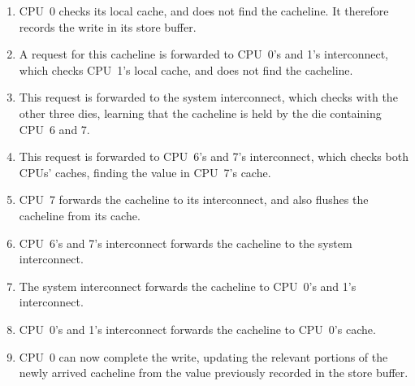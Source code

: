 \begin{enumerate}
\item	CPU~0 checks its local cache, and does not find the cacheline.
	It therefore records the write in its store buffer.
\item	A request for this cacheline is forwarded to CPU~0's and 1's
	interconnect, which checks CPU~1's local cache, and does not
	find the cacheline.
\item	This request is forwarded to the system interconnect, which
	checks with the other three dies, learning that the cacheline
	is held by the die containing CPU~6 and 7.
\item	This request is forwarded to CPU~6's and 7's interconnect, which
	checks both CPUs' caches, finding the value in CPU~7's cache.
\item	CPU~7 forwards the cacheline to its interconnect, and also
	flushes the cacheline from its cache.
\item	CPU~6's and 7's interconnect forwards the cacheline to the
	system interconnect.
\item	The system interconnect forwards the cacheline to CPU~0's and 1's
	interconnect.
\item	CPU~0's and 1's interconnect forwards the cacheline to CPU~0's
	cache.
\item	CPU~0 can now complete the write, updating the relevant portions
	of the newly arrived cacheline from the value previously
	recorded in the store buffer.
\end{enumerate}

